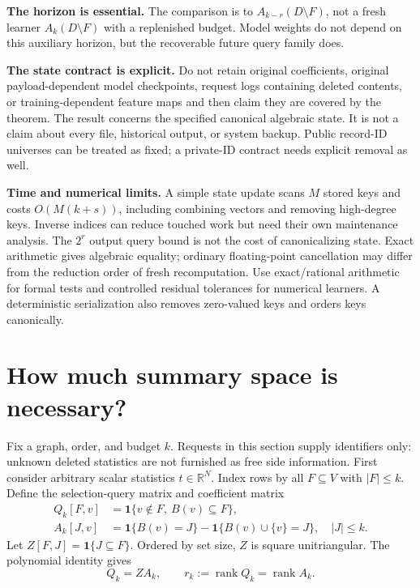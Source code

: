 \documentclass[11pt,a4paper]{article}
\theoremstyle{definition}\newtheorem{definition}[theorem]{Definition}
\newcommand{\R}{\mathbb R}\newcommand{\E}{\mathbb E}\newcommand{\1}{\mathbf 1}
\newcommand{\minus}{\setminus}
\begin{document}
\textbf{The horizon is essential.} The comparison is to $A_{k-r}(D\minus F)$, not a fresh learner $A_k(D\minus F)$ with a replenished budget. Model weights do not depend on this auxiliary horizon, but the recoverable future query family does.

\textbf{The state contract is explicit.} Do not retain original coefficients, original payload-dependent model checkpoints, request logs containing deleted contents, or training-dependent feature maps and then claim they are covered by the theorem. The result concerns the specified canonical algebraic state. It is not a claim about every file, historical output, or system backup. Public record-ID universes can be treated as fixed; a private-ID contract needs explicit removal as well.

\textbf{Time and numerical limits.} A simple state update scans $M$ stored keys and costs $O(M(k+s))$, including combining vectors and removing high-degree keys. Inverse indices can reduce touched work but need their own maintenance analysis. The $2^r$ output query bound is not the cost of canonicalizing state. Exact arithmetic gives algebraic equality; ordinary floating-point cancellation may differ from the reduction order of fresh recomputation. Use exact/rational arithmetic for formal tests and controlled residual tolerances for numerical learners. A deterministic serialization also removes zero-valued keys and orders keys canonically.

\section{How much summary space is necessary?}\label{sec:rank}
Fix a graph, order, and budget $k$. Requests in this section supply identifiers only: unknown deleted statistics are not furnished as free side information. First consider arbitrary scalar statistics $t\in\R^N$. Index rows by all $F\subseteq V$ with $|F|\le k$. Define the selection-query matrix and coefficient matrix
\begin{align}
 Q_k[F,v]&=\1\{v\notin F,\ B(v)\subseteq F\},\\
 A_k[J,v]&=\1\{B(v)=J\}-\1\{B(v)\cup\{v\}=J\},\quad |J|\le k.
\end{align}
Let $Z[F,J]=\1\{J\subseteq F\}$. Ordered by set size, $Z$ is square unitriangular. The polynomial identity gives
\begin{equation}
 Q_k=ZA_k,\qquad r_k:=\operatorname{rank}Q_k=\operatorname{rank}A_k.
\end{equation}
\end{document}

